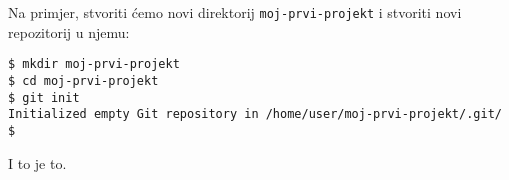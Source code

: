 Na primjer, stvoriti ćemo novi direktorij \verb+moj-prvi-projekt+ i stvoriti novi repozitorij u njemu:

\begin{verbatim}
$ mkdir moj-prvi-projekt
$ cd moj-prvi-projekt
$ git init
Initialized empty Git repository in /home/user/moj-prvi-projekt/.git/
$ 
\end{verbatim}

I to je to. 


